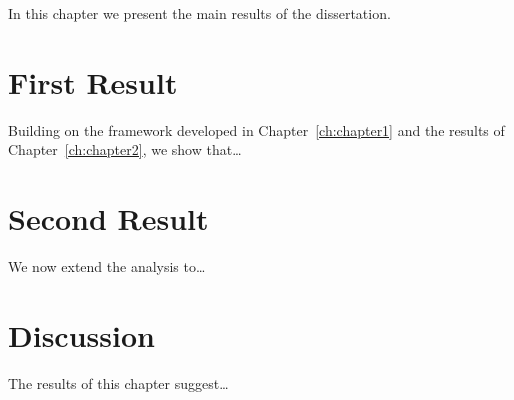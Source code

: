 
In this chapter we present the main results of the dissertation.

\section{First Result}

Building on the framework developed in Chapter~\ref{ch:chapter1}
and the results of Chapter~\ref{ch:chapter2}, we show that\ldots

\section{Second Result}

We now extend the analysis to\ldots

\section{Discussion}

The results of this chapter suggest\ldots
